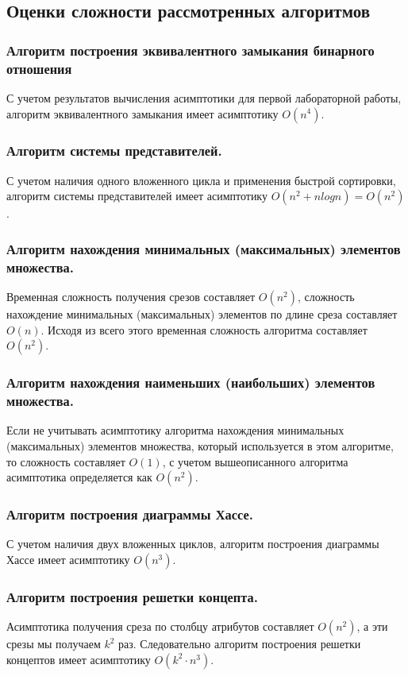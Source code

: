 \documentclass[spec, och, labwork]{shiza}
\begin{document}
        \subsection{Оценки сложности рассмотренных алгоритмов}

        \subsubsection{Алгоритм построения эквивалентного замыкания бинарного отношения}

        С учетом результатов вычисления асимптотики для первой лабораторной работы, алгоритм эквивалентного замыкания имеет асимптотику $O(n^4)$.

        \subsubsection{Алгоритм системы представителей.}
            С учетом наличия одного вложенного цикла и применения быстрой сортировки, алгоритм системы представителей имеет асимптотику $O(n^2 + nlogn) = O(n^2)$.
        \subsubsection{Алгоритм нахождения минимальных (максимальных) элементов множества.}
            Временная сложность получения срезов составляет $O(n^2)$, сложность нахождение минимальных (максимальных) элементов по длине
            среза составляет $O(n)$. Исходя из всего этого временная сложность алгоритма составляет $O(n^2)$.
        \subsubsection{Алгоритм нахождения наименьших (наибольших) элементов множества.}
            Если не учитывать асимптотику алгоритма нахождения минимальных (максимальных) элементов множества, который используется
            в этом алгоритме, то сложность составляет $O(1)$, с учетом вышеописанного алгоритма асимптотика определяется как
            $O(n^2)$.
        \subsubsection{Алгоритм построения диаграммы Хассе.}
            С учетом наличия двух вложенных циклов, алгоритм построения диаграммы Хассе имеет асимптотику $O(n^3)$.

        \subsubsection{Алгоритм построения решетки концепта.}
            Асимптотика получения среза по столбцу атрибутов составляет $O(n^2)$, а эти срезы мы получаем $k^2$ раз. 
            Следовательно алгоритм построения решетки концептов имеет асимптотику $O(k^2 \cdot n^3)$.
\conclusion
\end{document}
